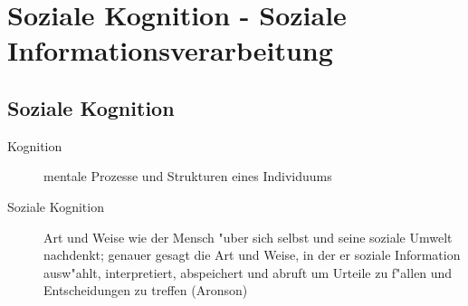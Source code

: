 \section{Soziale Kognition - Soziale Informationsverarbeitung}
\subsection{Soziale Kognition}
\begin{description}
	\item[Kognition] mentale Prozesse und Strukturen eines Individuums
	\item[Soziale Kognition] Art und Weise wie der Mensch "uber sich selbst und seine soziale Umwelt nachdenkt; genauer gesagt die Art und Weise, in der er soziale Information ausw"ahlt, interpretiert, abspeichert und abruft um Urteile zu f"allen und Entscheidungen zu treffen (Aronson)
\end{description}

